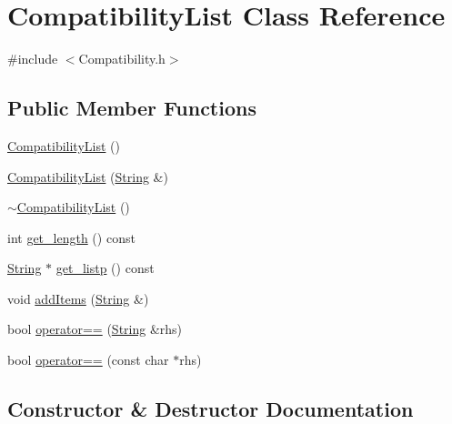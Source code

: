 \hypertarget{class_compatibility_list}{}\section{Compatibility\+List Class Reference}
\label{class_compatibility_list}


{\ttfamily \#include $<$Compatibility.\+h$>$}

\subsection*{Public Member Functions}
\begin{DoxyCompactItemize}
\item 
\mbox{\hyperlink{class_compatibility_list_a077f7dc792a5419fbd9a0d105133cfbd}{Compatibility\+List}} ()
\item 
\mbox{\hyperlink{class_compatibility_list_af34d724919febac11f933a4d42f3d550}{Compatibility\+List}} (\mbox{\hyperlink{class_string}{String}} \&)
\item 
\mbox{\hyperlink{class_compatibility_list_ac3f2eebda805a5b587c498a4915161fc}{$\sim$\+Compatibility\+List}} ()
\item 
int \mbox{\hyperlink{class_compatibility_list_a44d0f7533b66ced7a957f2846e76c4ec}{get\+\_\+length}} () const
\item 
\mbox{\hyperlink{class_string}{String}} $\ast$ \mbox{\hyperlink{class_compatibility_list_a16642e17369c398c67b04f549f2f77ac}{get\+\_\+listp}} () const
\item 
void \mbox{\hyperlink{class_compatibility_list_a7d9dbeada758ed1fc4849d77058ff69d}{add\+Items}} (\mbox{\hyperlink{class_string}{String}} \&)
\item 
bool \mbox{\hyperlink{class_compatibility_list_a3836f2aaefc1753287dd4d6052e17469}{operator==}} (\mbox{\hyperlink{class_string}{String}} \&rhs)
\item 
bool \mbox{\hyperlink{class_compatibility_list_ad476ceb7026c6316112d5f11b283357e}{operator==}} (const char $\ast$rhs)
\end{DoxyCompactItemize}


\subsection{Constructor \& Destructor Documentation}
\mbox{\label{class_compatibility_list_a077f7dc792a5419fbd9a0d105133cfbd}} 
